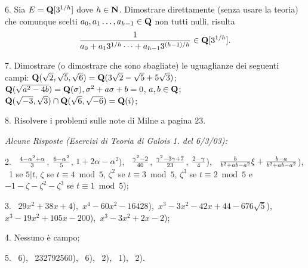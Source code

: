 \item{6.} Sia $E={\bf Q}[3^{1/h}]$ dove $h\in{\bf N}$. Dimostrare direttamente (senza usare la teoria)
che comunque scelti $a_0,a_1\ldots,a_{h-1}\in{\bf Q}$ non tutti nulli, risulta
$${1\over a_0+a_13^{1/h}\cdots+a_{h-1}3^{(h-1)/h}}\in{\bf Q}[3^{1/h}].$$
\bigskip

\item{7.} Dimostrare (o dimostrare che sono sbagliate) le uguaglianze dei seguenti campi:
 ${\bf Q}(\sqrt{2},\sqrt{5},\sqrt{6})={\bf Q}(3\sqrt{2}-\sqrt{5}+5\sqrt{3})$;\smallskip
{} ${\bf Q}(\sqrt{a^2-4b})={\bf Q}(\sigma), \sigma^2+a\sigma+b=0$, $a,b\in{\bf Q}$;\smallskip
{} ${\bf Q}(\sqrt{-3},\sqrt{3})\cap{\bf Q}(\sqrt{6},\sqrt{-6})={\bf Q}(i)$;
\bigskip

\item{8.} Risolvere i problemi sulle note di Milne a pagina 23.
\vfill

\eject

\centerline{\it Alcune Risposte (Esercizi di Teoria di Galois 1. del 6/3/03):}

\item{2.}
\ ${4-\alpha^2+\alpha\over3}$, ${6-\alpha^2\over5}$, $1+2\alpha-\alpha^2$),\medskip
{}\ ${\gamma^2-2\over40}$, ${\gamma^2-3\gamma+7\over 23}$, ${2-\gamma\over 4}$),\medskip
{}\ ${b\over b^2+ab-a^2}\xi+{b-a\over b^2+ab-a^2}$),\medskip
{}\ 1 se $5|t$,\hfill\break
$\zeta$ se $t\equiv4\bmod5$,\hfill\break
$\zeta^2$ se $t\equiv3\bmod5$,\hfill\break
$\zeta^3$ se $t\equiv2\bmod5$ e \hfill\break
$-1-\zeta-\zeta^2-\zeta^3$ se $t\equiv1\bmod5$);\bigskip

\item{3.} \ $29x^2+38x+4$),\medskip {}\
$x^4-60x^2-16428$),\medskip {}\
$x^3-3x^2-42x+44-676\sqrt{5}$),\medskip {}\
$x^3-19x^2+105x-200$),\medskip {}\
$x^3-3x^2+2x-2$);\bigskip

\item{4.} Nessuno \`{e} campo;\bigskip

\item{5.}
\ 6),\medskip
\itemitem{(b.}\ 232792560),\medskip
{}\ 6),\medskip
{}\ 2),\medskip
\itemitem{(e.}\ 1),\medskip
\itemitem{(f.}\ 2).
\bye
